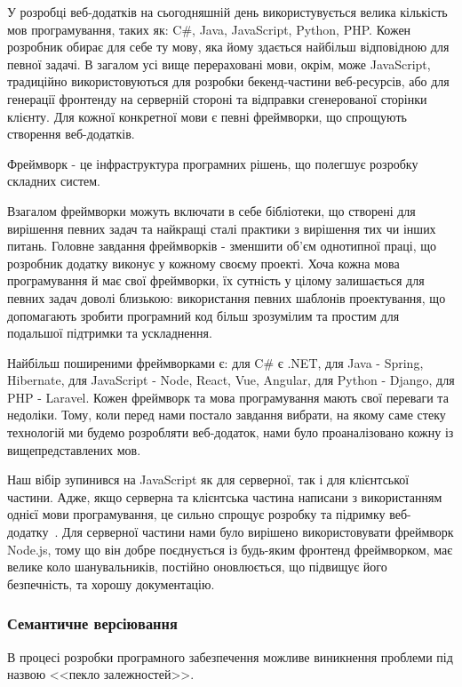 У розробці веб-додатків на сьогодняшній день використувується велика кількість мов програмування, таких як: C\#, Java, JavaScript, Python, PHP. Кожен розробник обирає для себе ту мову, яка йому здається найбільш відповідною для певної задачі. В загалом усі вище перераховані мови, окрім, може JavaScript, традиційно використовуються для розробки бекенд-частини веб-ресурсів, або для генерації фронтенду на серверній стороні та відправки сгенерованої сторінки клієнту. Для кожної конкретної мови є певні фреймворки, що спрощують створення веб-додатків.

Фреймворк - це інфраструктура програмних рішень, що полегшує розробку складних систем.

Взагалом фреймворки можуть включати в себе бібліотеки, що створені для вирішення певних задач та найкращі сталі практики з вирішення тих чи інших питань. Головне завдання фреймворків - зменшити об'єм однотипної праці, що розробник додатку виконує у кожному своєму проекті. Хоча кожна мова програмування й має свої фреймворки, їх сутність у цілому залишається для певних задач доволі близькою: використання певних шаблонів проектування, що допомагають зробити програмний код більш зрозумілим та простим для подальшої підтримки та ускладнення.

Найбільш поширеними фреймворками є: для C\# є .NET, для Java - Spring, Hibernate, для JavaScript - Node, React, Vue, Angular, для Python - Django, для PHP - Laravel. Кожен фреймворк та мова програмування мають свої переваги та недоліки. Тому, коли перед нами постало завдання вибрати, на якому саме стеку технологій ми будемо розробляти веб-додаток, нами було проаналізовано кожну із вищепредставлених мов.

Наш вібір зупинився на JavaScript як для серверної, так і для клієнтської частини. Адже, якщо серверна та клієнтська частина написани з використанням однієї мови програмування, це сильно спрощує розробку та підримку веб-додатку~\cite{vedantani2017}. Для серверної частини нами було вирішено використовувати фреймворк Node.js, тому що він добре поєднується із будь-яким фронтенд фреймворком, має велике коло шанувальників, постійно оновлюється, що підвищує його безпечність, та хорошу документацію.  

\subsubsection{Семантичне версіювання}

В процесі розробки програмного забезпечення можливе виникнення проблеми під назвою <<пекло залежностей>>. 

